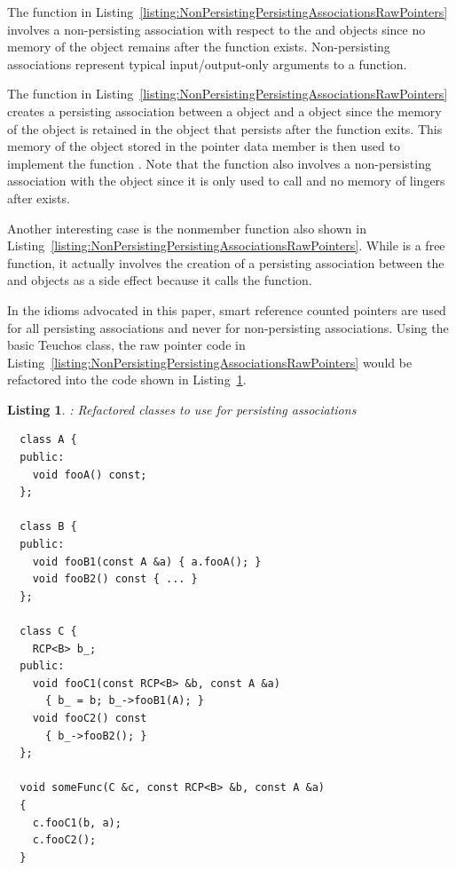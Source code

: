 \documentclass[pdf,ps2pdf,11pt]{SANDreport}
\newtheorem{listing}{Listing}
\begin{document}
The function {} in
Listing~\ref{listing:NonPersistingPersistingAssociationsRawPointers}
involves a non-persisting association with respect to the {}
and {} objects since no memory of the object {} remains
after the function {} exists.  Non-persisting
associations represent typical input/output-only arguments to a
function.

The function {} in
Listing~\ref{listing:NonPersistingPersistingAssociationsRawPointers}
creates a persisting association between a {} object and a
{} object since the memory of the {} object is retained
in the {} object that persists after the function
{} exits.  This memory of the {} object
stored in the {} pointer data member is then used to
implement the function {}.  Note that the function
{} also involves a non-persisting association with
the {} object {} since it is only used to call
{} and no memory of {} lingers after
{} exists.

Another interesting case is the nonmember function
{} also shown in
Listing~\ref{listing:NonPersistingPersistingAssociationsRawPointers}.
While {} is a free function, it actually involves
the creation of a persisting association between the {} and
{} objects as a side effect because it calls the
{} function.

In the idioms advocated in this paper, smart reference counted
pointers are used for all persisting associations and never for
non-persisting associations.  Using the basic Teuchos {}
class, the raw pointer code in
Listing~\ref{listing:NonPersistingPersistingAssociationsRawPointers}
would be refactored into the code shown in
Listing~\ref{listing:NonPersistingPersistingAssociationsRCP}.


{}\begin{listing}: Refactored classes to use {} for
persisting associations
\label{listing:NonPersistingPersistingAssociationsRCP}
{\small\begin{verbatim}
  class A {
  public:
    void fooA() const;
  };

  class B {
  public:
    void fooB1(const A &a) { a.fooA(); }
    void fooB2() const { ... }
  };

  class C {
    RCP<B> b_;
  public:
    void fooC1(const RCP<B> &b, const A &a)
      { b_ = b; b_->fooB1(A); }
    void fooC2() const
      { b_->fooB2(); }
  };

  void someFunc(C &c, const RCP<B> &b, const A &a)
  {
    c.fooC1(b, a);
    c.fooC2();
  }
\end{verbatim}}
\end{listing}
\end{document}
